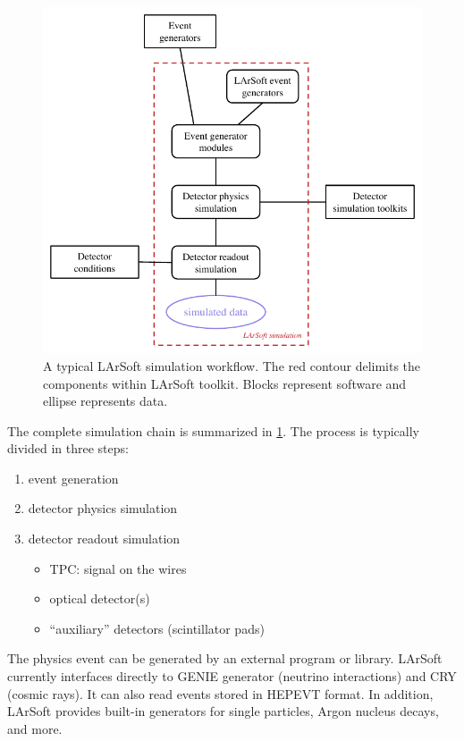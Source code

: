 \begin{figure}
   \centering
   \includegraphics{figures/LArSoftSimulationWorkflow.pdf}
   \caption{\label{fig:LArSoftSimulation}
      A typical LArSoft simulation workflow.
      The red contour delimits the components within LArSoft toolkit.
      Blocks represent software and ellipse represents data.
   }
\end{figure}
The complete simulation chain is summarized in \cref{fig:LArSoftSimulation}.
The process is typically divided in three steps:
\begin{enumerate}
   \item event generation
   \item detector physics simulation
   \item detector readout simulation
      \begin{itemize}
         \item TPC: signal on the wires
         \item optical detector(s)
         \item ``auxiliary'' detectors (\eg scintillator pads)
      \end{itemize}
\end{enumerate}

The physics event can be generated by an external program or library.
LArSoft currently interfaces directly to GENIE generator (neutrino interactions)
and CRY (cosmic rays). It can also read events stored in HEPEVT format.
In addition, LArSoft provides built-in generators for single particles,
Argon nucleus decays, and more.

